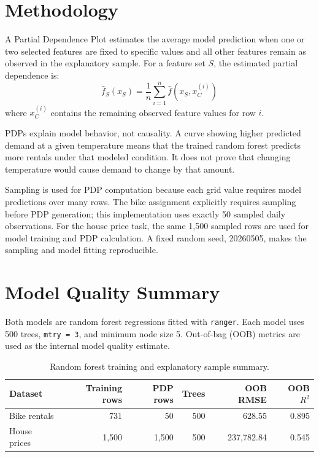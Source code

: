 \documentclass[11pt,a4paper]{article}
\begin{document}
\section{Methodology}

A Partial Dependence Plot estimates the average model prediction when one or two selected features are fixed to specific values and all other features remain as observed in the explanatory sample. For a feature set $S$, the estimated partial dependence is:
\[
\hat{f}_{S}(x_S) = \frac{1}{n}\sum_{i=1}^{n} \hat{f}(x_S, x_C^{(i)})
\]
where $x_C^{(i)}$ contains the remaining observed feature values for row $i$.

PDPs explain model behavior, not causality. A curve showing higher predicted demand at a given temperature means that the trained random forest predicts more rentals under that modeled condition. It does not prove that changing temperature would cause demand to change by that amount.

Sampling is used for PDP computation because each grid value requires model predictions over many rows. The bike assignment explicitly requires sampling before PDP generation; this implementation uses exactly 50 sampled daily observations. For the house price task, the same 1,500 sampled rows are used for model training and PDP calculation. A fixed random seed, 20260505, makes the sampling and model fitting reproducible.

\section{Model Quality Summary}

Both models are random forest regressions fitted with \texttt{ranger}. Each model uses 500 trees, \texttt{mtry = 3}, and minimum node size 5. Out-of-bag (OOB) metrics are used as the internal model quality estimate.

\begin{table}[H]
\centering
\begin{tabular}{lrrrrr}
\toprule
Dataset & Training rows & PDP rows & Trees & OOB RMSE & OOB $R^2$ \\
\midrule
Bike rentals & 731 & 50 & 500 & 628.55 & 0.895 \\
House prices & 1,500 & 1,500 & 500 & 237,782.84 & 0.545 \\
\bottomrule
\end{tabular}
\caption{Random forest training and explanatory sample summary.}
\end{table}
\end{document}
